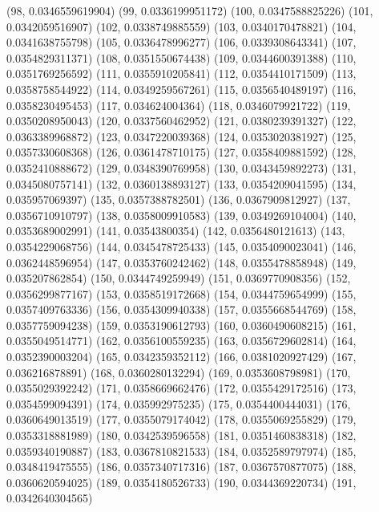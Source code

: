 {					(98, 0.0346559619904)
					(99, 0.0336199951172)
					(100, 0.0347588825226)
					(101, 0.0342059516907)
					(102, 0.0338749885559)
					(103, 0.0340170478821)
					(104, 0.0341638755798)
					(105, 0.0336478996277)
					(106, 0.0339308643341)
					(107, 0.0354829311371)
					(108, 0.0351550674438)
					(109, 0.0344600391388)
					(110, 0.0351769256592)
					(111, 0.0355910205841)
					(112, 0.0354410171509)
					(113, 0.0358758544922)
					(114, 0.0349259567261)
					(115, 0.0356540489197)
					(116, 0.0358230495453)
					(117, 0.034624004364)
					(118, 0.0346079921722)
					(119, 0.0350208950043)
					(120, 0.0337560462952)
					(121, 0.0380239391327)
					(122, 0.0363389968872)
					(123, 0.0347220039368)
					(124, 0.0353020381927)
					(125, 0.0357330608368)
					(126, 0.0361478710175)
					(127, 0.0358409881592)
					(128, 0.0352410888672)
					(129, 0.0348390769958)
					(130, 0.0343459892273)
					(131, 0.0345080757141)
					(132, 0.0360138893127)
					(133, 0.0354209041595)
					(134, 0.035957069397)
					(135, 0.0357388782501)
					(136, 0.0367909812927)
					(137, 0.0356710910797)
					(138, 0.0358009910583)
					(139, 0.0349269104004)
					(140, 0.0353689002991)
					(141, 0.03543800354)
					(142, 0.0356480121613)
					(143, 0.0354229068756)
					(144, 0.0345478725433)
					(145, 0.0354090023041)
					(146, 0.0362448596954)
					(147, 0.0353760242462)
					(148, 0.0355478858948)
					(149, 0.035207862854)
					(150, 0.0344749259949)
					(151, 0.0369770908356)
					(152, 0.0356299877167)
					(153, 0.0358519172668)
					(154, 0.0344759654999)
					(155, 0.0357409763336)
					(156, 0.0354309940338)
					(157, 0.0355668544769)
					(158, 0.0357759094238)
					(159, 0.0353190612793)
					(160, 0.0360490608215)
					(161, 0.0355049514771)
					(162, 0.0356100559235)
					(163, 0.0356729602814)
					(164, 0.0352390003204)
					(165, 0.0342359352112)
					(166, 0.0381020927429)
					(167, 0.036216878891)
					(168, 0.0360280132294)
					(169, 0.0353608798981)
					(170, 0.0355029392242)
					(171, 0.0358669662476)
					(172, 0.0355429172516)
					(173, 0.0354599094391)
					(174, 0.035992975235)
					(175, 0.0354400444031)
					(176, 0.0360649013519)
					(177, 0.0355079174042)
					(178, 0.0355069255829)
					(179, 0.0353318881989)
					(180, 0.0342539596558)
					(181, 0.0351460838318)
					(182, 0.0359340190887)
					(183, 0.0367810821533)
					(184, 0.0352589797974)
					(185, 0.0348419475555)
					(186, 0.0357340717316)
					(187, 0.0367570877075)
					(188, 0.0360620594025)
					(189, 0.0354180526733)
					(190, 0.0344369220734)
					(191, 0.0342640304565)
}

